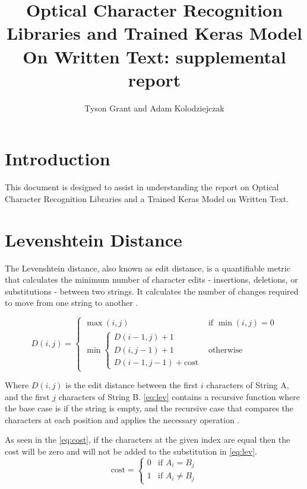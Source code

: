 \documentclass[9pt]{osa-supplemental-document}
\title{Optical Character Recognition Libraries and Trained Keras Model On Written Text: supplemental report}
\author{Tyson Grant and Adam Kolodziejczak} %
\begin{document}
\maketitle

\section{Introduction}

This document is designed to assist in understanding the report on Optical Character Recognition Libraries and a Trained Keras Model on Written Text.

\section{Levenshtein Distance}

The Levenshtein distance, also known as edit distance, is a quantifiable metric that calculates the minimum number of character edits - insertions, deletions, or substitutions - between two strings. It calculates the number of changes required to move from one string to another \cite{paperspace_levenshtein}.

\begin{equation}
    D(i, j) = 
    \begin{cases}
    \max(i, j) & \text{if } \min(i, j) = 0 \\
    \min \begin{cases}
        D(i - 1, j) + 1 \\
        D(i, j - 1) + 1 \\
        D(i - 1, j - 1) + \text{cost}
    \end{cases} & \text{otherwise}
    \end{cases}
    \label{eq:lev}
\end{equation}

Where $D(i, j)$ is the edit distance between the first $i$ characters of String A, and the first $j$ characters of String B. \eqref{eq:lev} contains a recursive function where the base case is if the string is empty, and the recursive case that compares the characters at each position and applies the necessary operation \cite{paperspace_levenshtein}. 

As seen in the \eqref{eq:cost}, if the characters at the given index are equal then the cost will be zero and will not be added to the substitution in \eqref{eq:lev}.
\begin{equation}
    \text{cost} = 
    \begin{cases}
        0 & \text{if } A_i = B_j \\
        1 & \text{if } A_i \ne B_j
    \end{cases}
    \label{eq:cost}
\end{equation}
\end{document}

